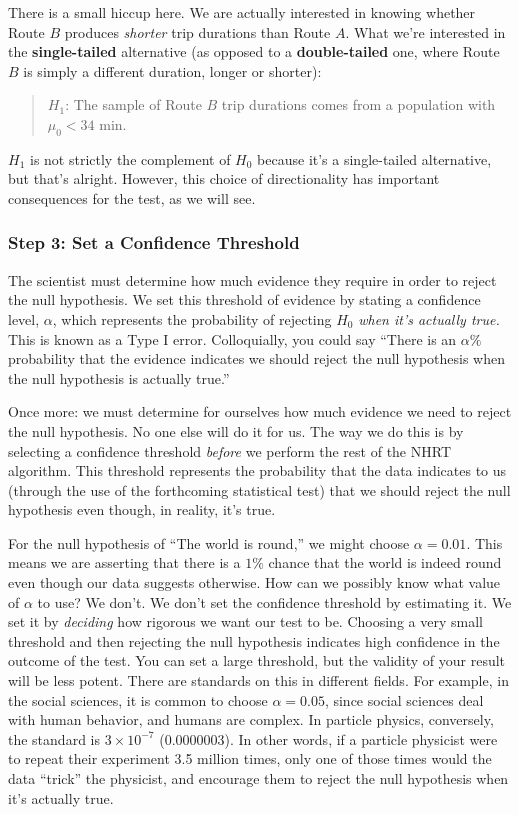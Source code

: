There is a small hiccup here. We are actually interested in knowing whether Route $B$ produces \textit{shorter} trip durations than Route $A$. What we're interested in the \textbf{single-tailed} alternative (as opposed to a \textbf{double-tailed} one, where Route $B$ is simply a different duration, longer or shorter):
\begin{quote}
    $H_1$: The sample of Route $B$ trip durations comes from a population with $\mu_0 < 34 \text{ min}$.
\end{quote}

\noindent $H_1$ is not strictly the complement of $H_0$ because it's a single-tailed alternative, but that's alright. However, this choice of directionality has important consequences for the test, as we will see.

\subsubsection*{Step 3: Set a Confidence Threshold}
The scientist must determine how much evidence they require in order to reject the null hypothesis. We set this threshold of evidence by stating a confidence level, $\alpha$, which represents the probability of rejecting $H_0$ \textit{when it's actually true.} This is known as a Type I error. Colloquially, you could say ``There is an $\alpha\%$  probability that the evidence indicates we should reject the null hypothesis when the null hypothesis is actually true.''

Once more: we must determine for ourselves how much evidence we need to reject the null hypothesis. No one else will do it for us. The way we do this is by selecting a confidence threshold \textit{before} we perform the rest of the NHRT algorithm. This threshold represents the probability that the data indicates to us (through the use of the forthcoming statistical test) that we should reject the null hypothesis even though, in reality, it's true.

For the null hypothesis of ``The world is round,'' we might choose $\alpha=0.01$. This means we are asserting that there is a $1\%$ chance that the world is indeed round even though our data suggests otherwise. How can we possibly know what value of $\alpha$ to use? We don't. We don't set the confidence threshold by estimating it. We set it by \textit{deciding} how rigorous we want our test to be. Choosing a very small threshold and then rejecting the null hypothesis indicates high confidence in the outcome of the test. You can set a large threshold, but the validity of your result will be less potent. There are standards on this in different fields. For example, in the social sciences, it is common to choose $\alpha=0.05$, since social sciences deal with human behavior, and humans are complex. In particle physics, conversely, the standard is $3\times10^{-7}$ (0.0000003). In other words, if a particle physicist were to repeat their experiment 3.5 million times, only one of those times would the data ``trick'' the physicist, and encourage them to reject the null hypothesis when it's actually true.

